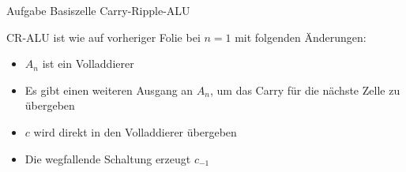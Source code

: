 \begin{frame}[allowframebreaks]{Aufgabe \thesection}{Basiszelle Carry-Ripple-ALU}
\begin{solutionnoinc}
CR-ALU ist wie auf vorheriger Folie bei $n=1$ mit folgenden Änderungen:
    \begin{itemize}
        \item $A_n$ ist ein Volladdierer
        \item Es gibt einen weiteren Ausgang an $A_n$, um das Carry für die nächste Zelle zu übergeben
        \item $c$ wird direkt in den Volladdierer übergeben
        \item Die wegfallende Schaltung erzeugt $c_{-1}$
    \end{itemize}
\end{solutionnoinc}

\end{frame}
